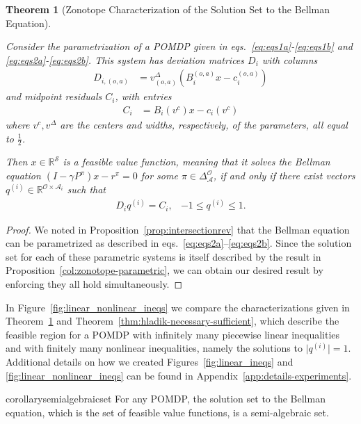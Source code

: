 \documentclass{article}
\newtheorem{theorem}{Theorem}[section]
\theoremstyle{definition}
\theoremstyle{remark}
\begin{document}
\begin{theorem}[Zonotope Characterization of the Solution Set to the Bellman Equation] 
\label{thm:zonotope_mdp} 

Consider the parametrization of a POMDP given in eqs.~\ref{eq:eqs1a}-\ref{eq:eqs1b} and \ref{eq:eqs2a}-\ref{eq:eqs2b}. This system has deviation matrices $D_i$ with columns
\begin{align*}
    D_{i,(o,a)} &= v_{(o,a)}^\Delta (B_i^{(o,a)}x - c_i^{(o,a)})
\end{align*} 
and midpoint residuals $C_i$, with entries
\begin{align*}
    C_i &= B_i(v^c)x - c_i(v^c)
\end{align*}
%
where $v^c, v^\Delta$ are the centers and widths, respectively, of the parameters, all equal to $\tfrac12$. 

Then $x\in\mathbb{R}^\mathcal{S}$ is a feasible value function, meaning that it solves the Bellman equation $(I-\gamma P^\pi)x - r^\pi=0$ for some $\pi\in\Delta^\mathcal{O}_\mathcal{A}$,  if and only if there exist vectors $q^{(i)} \in \mathbb{R}^{\mathcal{O}\times\mathcal{A}_i}$ such that
\begin{align*}
     D_iq^{(i)} = C_i, &-1 \leq q^{(i)} \leq 1.
\end{align*}
\end{theorem}

\begin{proof}
    We noted in Proposition~\ref{prop:intersectionrev} that the Bellman equation can be parametrized as described in 
    eqs.~\ref{eq:eqs2a}--\ref{eq:eqs2b}. 
%
    Since the solution set for each of these parametric systems is itself described by the result in Proposition~\ref{col:zonotope-parametric}, we can obtain our desired result by enforcing they all hold simultaneously. 
\end{proof}

In Figure~\ref{fig:linear_nonlinear_ineqs} we compare the characterizations given in Theorem~\ref{thm:zonotope_mdp} and Theorem~\ref{thm:hladik-necessary-sufficient}, which describe the feasible region for a POMDP with infinitely many piecewise linear inequalities and with finitely many nonlinear inequalities, namely the solutions to $\vert q^{(i)} \vert = 1$. 
Additional details on how we created Figures~\ref{fig:linear_ineqs} and \ref{fig:linear_nonlinear_ineqs} can be found in Appendix~\ref{app:details-experiments}. 


\begin{restatable}{corollary}{semialgebraicset}
\label{col:semi_algebraic_set}
    For any POMDP, the solution set to the Bellman equation, which is the set of feasible value functions, is a semi-algebraic set. 
\end{restatable} 
\end{document}
